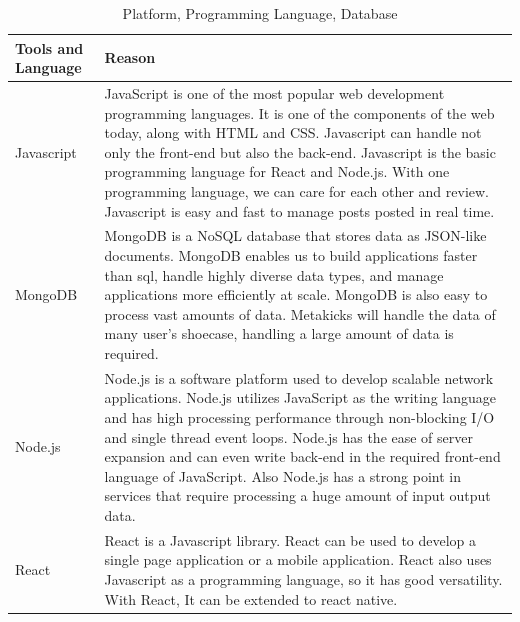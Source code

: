 \documentclass[conference]{IEEEtran}
\begin{document}
\begin{table}[h]
\caption{Platform, Programming Language, Database}
\def\arraystretch{1.25} \small
    \begin{tabular}{|p{2.4cm}|p{5.0cm}|}
	\hline
	Tools and Language & Reason\\
      \hline
       Javascript & JavaScript is one of the most popular web development programming languages. It is one of the components of the web today, along with HTML and CSS. Javascript can handle not only the front-end but also the back-end. Javascript is the basic programming language for React and Node.js. With one programming language, we can care for each other and review. Javascript is easy and fast to manage posts posted in real time. \\
	\hline
        MongoDB & MongoDB is a NoSQL database that stores data as JSON-like documents. MongoDB enables us to build applications faster than sql, handle highly diverse data types, and manage applications more efficiently at scale. MongoDB is also easy to process vast amounts of data. Metakicks will handle the data of many user's shoecase, handling a large amount of data is required.\\
	\hline
        Node.js & Node.js is a software platform used to develop scalable network applications. Node.js utilizes JavaScript as the writing language and has high processing performance through non-blocking I/O and single thread event loops. Node.js has the ease of server expansion and can even write back-end in the required front-end language of JavaScript. Also Node.js has a strong point in services that require processing a huge amount of input output data.\\
	\hline
	React & React is a Javascript library. React can be used to develop a single page application or a mobile application. React also uses Javascript as a programming language, so it has good versatility. With React, It can be extended to react native.\\
	\hline
	\end{tabular}
\end{table}
\end{document}

